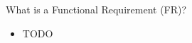 

\begin{Slide}{What is a Functional Requirement (FR)?}

\begin{itemize}
\item TODO

\end{itemize}
\end{Slide}